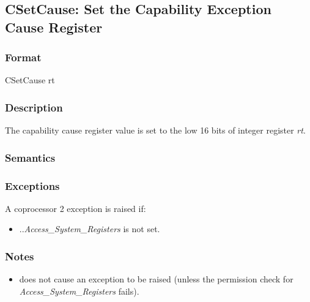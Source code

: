 \clearpage
{}
{}
\subsection*{CSetCause: Set the Capability Exception Cause Register}

\subsubsection*{Format}

CSetCause rt

\begin{center}
\end{center}

\subsubsection*{Description}

The capability cause register value is set to the low 16 bits of integer
register \textit{rt}.


\subsubsection*{Semantics}


\subsubsection*{Exceptions}

A coprocessor 2 exception is raised if:

\begin{itemize}
\item
\PCC{}.\cperms{}.\emph{Access\_System\_Registers} is not set.
\end{itemize}

\subsubsection*{Notes}

\begin{itemize}
\item
{} does not cause an exception to be raised (unless
the permission check for \emph{Access\_System\_Registers} fails).
\end{itemize}
